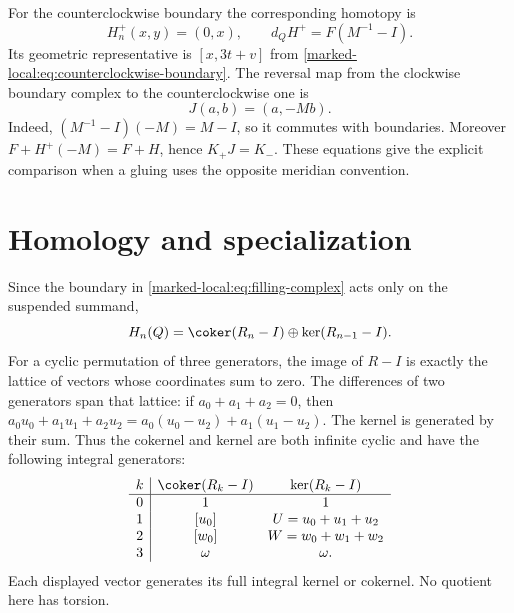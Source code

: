For the counterclockwise boundary the corresponding homotopy is
\begin{equation}\label{marked-local:eq:positive-H}
 H_n^+(x,y)=(0,x),\qquad d_QH^+=F(M^{-1}-I).
\end{equation}
Its geometric representative is $[x,3t+v]$ from
\eqref{marked-local:eq:counterclockwise-boundary}.
The reversal map from the clockwise boundary complex to the
counterclockwise one is
\[
 J(a,b)=(a,-Mb).
\]
Indeed, $(M^{-1}-I)(-M)=M-I$, so it commutes with boundaries.
Moreover $F+H^+(-M)=F+H$, hence $K_+J=K_-$.
These equations give the explicit comparison when a gluing uses the
opposite meridian convention.

\section{Homology and specialization}

Since the boundary in
\eqref{marked-local:eq:filling-complex} acts only on the suspended summand,
\begin{equation}\label{marked-local:eq:Q-homology}
 H_n(Q)=\coker(R_n-I)\oplus\ker(R_{n-1}-I).
\end{equation}
For a cyclic permutation of three generators, the image of $R-I$
is exactly the lattice of vectors whose coordinates sum to zero.
The differences of two generators span that lattice: if
$a_0+a_1+a_2=0$, then
$a_0u_0+a_1u_1+a_2u_2=a_0(u_0-u_2)+a_1(u_1-u_2)$.
The kernel is generated by their sum. Thus the cokernel and kernel
are both infinite cyclic and have the following integral generators:
\[
 \begin{array}{c|cc}
 k&\coker(R_k-I)&\ker(R_k-I)\\ \hline
 0&1&1\\
 1&[u_0]&U=u_0+u_1+u_2\\
 2&[w_0]&W=w_0+w_1+w_2\\
 3&\omega&\omega.
 \end{array}
\]
Each displayed vector generates its full integral kernel or cokernel.
No quotient here has torsion.

